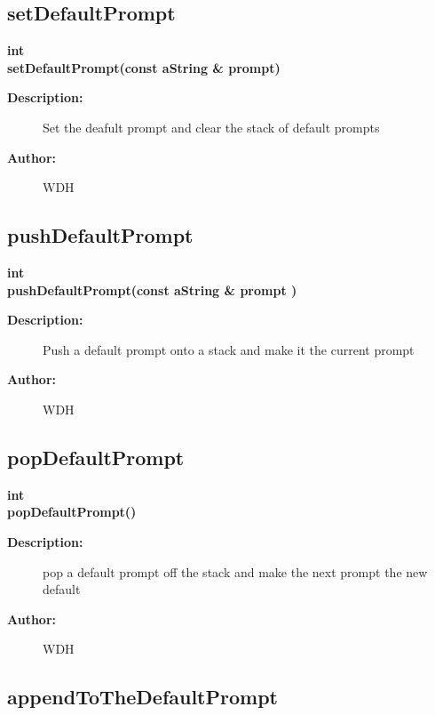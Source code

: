 \subsection{setDefaultPrompt}
 
\begin{flushleft} \textbf{%
int  \\ 
\settowidth{\GenericGraphicsInterfaceIncludeArgIndent}{setDefaultPrompt(}%
setDefaultPrompt(const aString \& prompt)
}\end{flushleft}
\begin{description}
\item[{\bf Description:}] 
 Set the deafult prompt and clear the stack of default prompts
\item[{\bf Author:}]  WDH
\end{description}
\subsection{pushDefaultPrompt}
 
\begin{flushleft} \textbf{%
int  \\ 
\settowidth{\GenericGraphicsInterfaceIncludeArgIndent}{pushDefaultPrompt(}%
pushDefaultPrompt(const aString \& prompt )
}\end{flushleft}
\begin{description}
\item[{\bf Description:}] 
 Push a default prompt onto a stack and make it the current prompt
\item[{\bf Author:}]  WDH
\end{description}
\subsection{popDefaultPrompt}
 
\begin{flushleft} \textbf{%
int  \\ 
\settowidth{\GenericGraphicsInterfaceIncludeArgIndent}{popDefaultPrompt(}%
popDefaultPrompt()
}\end{flushleft}
\begin{description}
\item[{\bf Description:}] 
 pop a default prompt off the stack and make the next prompt the new default
\item[{\bf Author:}]  WDH
\end{description}
\subsection{appendToTheDefaultPrompt}
 
